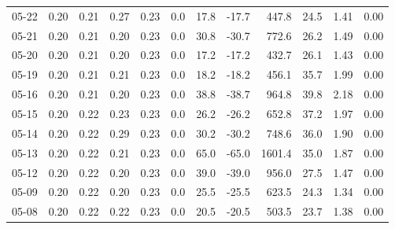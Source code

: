 \begin{threeparttable}
{\begin{tabular}{lrrrrrrrrrrr}
  05-22 &          0.20 &          0.21 &          0.27 &        0.23 &                 0.0 &                17.8 &      -17.7 &               447.8 &             24.5 &            1.41 &                   0.00 \\
  05-21 &          0.20 &          0.21 &          0.20 &        0.23 &                 0.0 &                30.8 &      -30.7 &               772.6 &             26.2 &            1.49 &                   0.00 \\
  05-20 &          0.20 &          0.21 &          0.20 &        0.23 &                 0.0 &                17.2 &      -17.2 &               432.7 &             26.1 &            1.43 &                   0.00 \\
  05-19 &          0.20 &          0.21 &          0.21 &        0.23 &                 0.0 &                18.2 &      -18.2 &               456.1 &             35.7 &            1.99 &                   0.00 \\
  05-16 &          0.20 &          0.21 &          0.20 &        0.23 &                 0.0 &                38.8 &      -38.7 &               964.8 &             39.8 &            2.18 &                   0.00 \\
  05-15 &          0.20 &          0.22 &          0.23 &        0.23 &                 0.0 &                26.2 &      -26.2 &               652.8 &             37.2 &            1.97 &                   0.00 \\
  05-14 &          0.20 &          0.22 &          0.29 &        0.23 &                 0.0 &                30.2 &      -30.2 &               748.6 &             36.0 &            1.90 &                   0.00 \\
  05-13 &          0.20 &          0.22 &          0.21 &        0.23 &                 0.0 &                65.0 &      -65.0 &              1601.4 &             35.0 &            1.87 &                   0.00 \\
  05-12 &          0.20 &          0.22 &          0.20 &        0.23 &                 0.0 &                39.0 &      -39.0 &               956.0 &             27.5 &            1.47 &                   0.00 \\
  05-09 &          0.20 &          0.22 &          0.20 &        0.23 &                 0.0 &                25.5 &      -25.5 &               623.5 &             24.3 &            1.34 &                   0.00 \\
  05-08 &          0.20 &          0.22 &          0.22 &        0.23 &                 0.0 &                20.5 &      -20.5 &               503.5 &             23.7 &            1.38 &                   0.00 \\

\end{tabular}}
\end{threeparttable}
